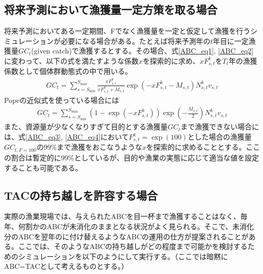 \documentclass[11pt]{jsarticle}
\begin{document}
 

\subsection{将来予測において漁獲量一定方策を取る場合\label{ConstCatch}}

将来予測においてある一定期間、Fでなく漁獲量を一定と仮定して漁獲を行うシミュレーションが必要になる場合がある\cite{suketou}。たとえば将来予測年の$t$年目に一定漁獲量$GC_{t}$(given catch)で漁獲するとする。その場合、式\ref{ABC_eq1}, \ref{ABC_eq2}に変わって、以下の式を満たすような係数$x$を探索的に求め、$xF_{s,t}^k$を$T_t$年の漁獲係数として個体群動態式の中で用いる。
\begin{eqnarray}
  GC_{t}=\sum_{s=S_{\mathrm{min}}}^{S_{\mathrm{max}}} \frac{xF_{s,t}^k}{xF_{s,t}^k+M_{s,t}}
  \exp(- xF_{s,t}^k-M_{s,t}) N_{s,t}^k v_{s,t}
\label{ABC_eq3}
\end{eqnarray}
Popeの近似式を使っている場合には
\begin{eqnarray}
  GC_{t}=\sum_{s=S_{\mathrm{min}}}^{S_{\mathrm{max}}} (1-\exp(- xF_{s,t}^k)) \exp(-\frac{M_{s,t}}{2}) N_{s,t}^k v_{s,t}
\label{ABC_eq4}
\end{eqnarray}
また、資源量が少なくなりすぎて目的とする漁獲量$GC_{t}$まで漁獲できない場合には、式\ref{ABC_eq3}, \ref{ABC_eq4}において$F_{s,t}^k=\exp(100)$とした場合の漁獲量$GC_{t,F=100}$の99\%まで漁獲をおこなうような$x$を探索的に求めることとする。ここの割合は暫定的に99\%としているが、目的や漁業の実態に応じて適当な値を設定することも可能である。

\subsection{TACの持ち越しを許容する場合}
実際の漁業現場では、与えられたABCを目一杯まで漁獲することはなく、毎年、何割かのABCが未消化のままとなる状況がよく見られる。そこで、未消化分のABCを翌年のに付け替えるようなABCの運用の仕方が提案されることがある。ここでは、そのようなABCの持ち越しがどの程度まで可能かを検討するためのシミュレーションを以下のようにして実行する。（ここでは暗黙にABC=TACとして考えるものとする。）
\end{document}
